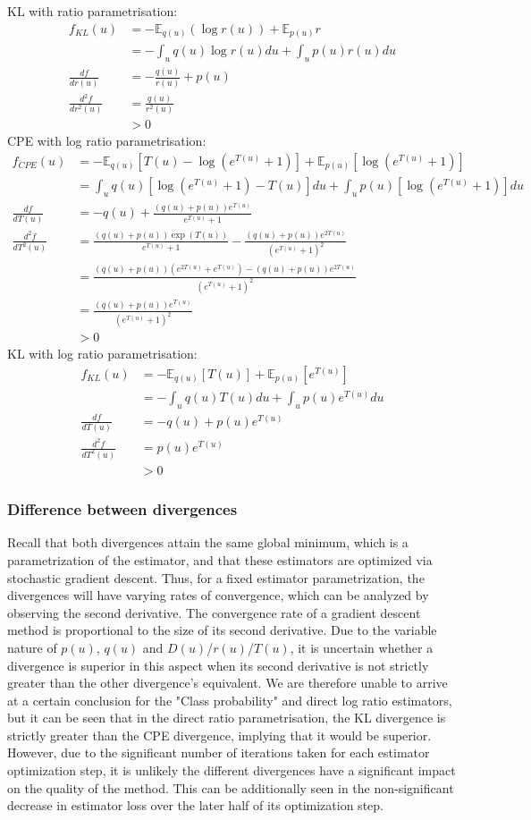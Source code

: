 \documentclass[a4paper,12pt]{article}
\newcommand{\E}{\mathbb{E}}
\numberwithin{equation}{section}
\begin{document}
KL with ratio parametrisation:
\begin{align*}
f_{KL}(u)&=-\E_{q(u)}(\log r(u))+\E_{p(u)}r\\
&=-\int_u q(u)\log r(u) du+\int_u p(u)r(u)du\\
\frac{df}{dr(u)}&=-\frac{q(u)}{r(u)}+p(u)\\
\frac{d^2f}{dr^2(u)}&=\frac{q(u)}{r^2(u)}\\
&>0
\end{align*}
CPE with log ratio parametrisation:
\begin{align*}
f_{CPE}(u)&=-\E_{q(u)}[T(u)-\log(e^{T(u)}+1)]+\E_{p(u)}[\log(e^{T(u)}+1)]\\
&=\int_u q(u)[\log(e^{T(u)}+1)-T(u)] du+\int_u p(u)[\log(e^{T(u)}+1)]du\\
\frac{df}{dT(u)}&=-q(u)+\frac{(q(u)+p(u))e^{T(u)}}{e^{T(u)}+1}\\
\frac{d^2f}{dT^2(u)}&=\frac{(q(u)+p(u))\exp(T(u))}{e^{T(u)}+1}-\frac{(q(u)+p(u))e^{2T(u)}}{(e^{T(u)}+1)^2}\\
&=\frac{(q(u)+p(u))(e^{2T(u)}+e^{T(u)})-(q(u)+p(u))e^{2T(u)}}{(e^{T(u)}+1)^2}\\
&=\frac{(q(u)+p(u))e^{T(u)}}{(e^{T(u)}+1)^2}\\
&>0
\end{align*}
KL with log ratio parametrisation:
\begin{align*}
f_{KL}(u)&=-\E_{q(u)}[T(u)]+\E_{p(u)}[e^{T(u)}]\\
&=-\int_u q(u)T(u)du+\int_u p(u)e^{T(u)}du\\
\frac{df}{dT(u)}&=-q(u)+p(u)e^{T(u)}\\
\frac{d^2f}{dT^2(u)}&=p(u)e^{T(u)}\\
&>0
\end{align*}
\subsubsection{Difference between divergences}
Recall that both divergences attain the same global minimum, which is a parametrization of the estimator, and that these estimators are optimized via stochastic gradient descent. Thus, for a fixed estimator parametrization, the divergences will have varying rates of convergence, which can be analyzed by observing the second derivative. The convergence rate of a gradient descent method is proportional to the size of its second derivative. Due to the variable nature of $p(u)$, $q(u)$ and $D(u)$/$r(u)$/$T(u)$, it is uncertain whether a divergence is superior in this aspect when its second derivative is not strictly greater than the other divergence's equivalent. We are therefore unable to arrive at a certain conclusion for the "Class probability" and direct log ratio estimators, but it can be seen that in the direct ratio parametrisation, the KL divergence is strictly greater than the CPE divergence, implying that it would be superior. However, due to the significant number of iterations taken for each estimator optimization step, it is unlikely the different divergences have a significant impact on the quality of the method. This can be additionally seen in the non-significant decrease in estimator loss over the later half of its optimization step.
\end{document}
